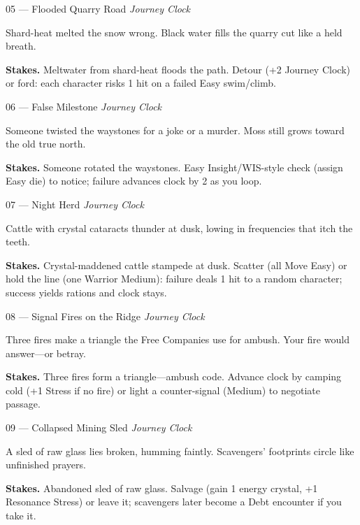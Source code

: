 \begin{encounterentry}{05 --- Flooded Quarry Road}
\textit{Journey Clock}

Shard-heat melted the snow wrong. Black water fills the quarry cut like a held breath.

\textbf{Stakes.} Meltwater from shard-heat floods the path. Detour (+2 Journey Clock) or ford: each character risks 1 hit on a failed Easy swim/climb.
\end{encounterentry}

\begin{encounterentry}{06 --- False Milestone}
\textit{Journey Clock}

Someone twisted the waystones for a joke or a murder. Moss still grows toward the old true north.

\textbf{Stakes.} Someone rotated the waystones. Easy Insight/WIS-style check (assign Easy die) to notice; failure advances clock by 2 as you loop.
\end{encounterentry}

\begin{encounterentry}{07 --- Night Herd}
\textit{Journey Clock}

Cattle with crystal cataracts thunder at dusk, lowing in frequencies that itch the teeth.

\textbf{Stakes.} Crystal-maddened cattle stampede at dusk. Scatter (all Move Easy) or hold the line (one Warrior Medium): failure deals 1 hit to a random character; success yields rations and clock stays.
\end{encounterentry}

\begin{encounterentry}{08 --- Signal Fires on the Ridge}
\textit{Journey Clock}

Three fires make a triangle the Free Companies use for ambush. Your fire would answer---or betray.

\textbf{Stakes.} Three fires form a triangle---ambush code. Advance clock by camping cold (+1 Stress if no fire) or light a counter-signal (Medium) to negotiate passage.
\end{encounterentry}

\begin{encounterentry}{09 --- Collapsed Mining Sled}
\textit{Journey Clock}

A sled of raw glass lies broken, humming faintly. Scavengers' footprints circle like unfinished prayers.

\textbf{Stakes.} Abandoned sled of raw glass. Salvage (gain 1 energy crystal, +1 Resonance Stress) or leave it; scavengers later become a Debt encounter if you take it.
\end{encounterentry}


